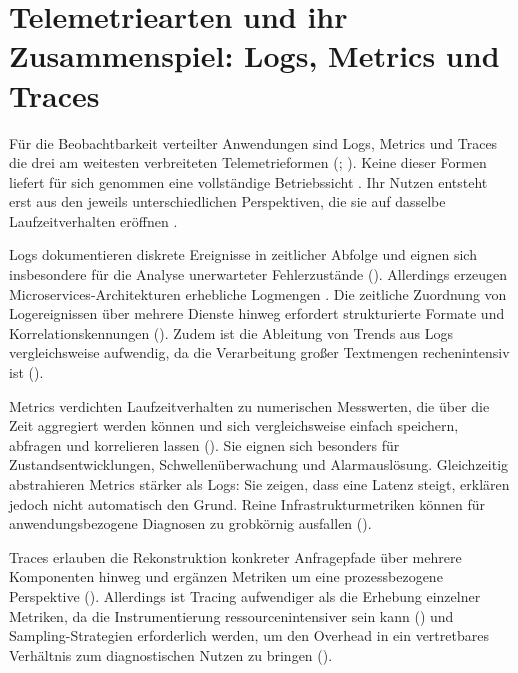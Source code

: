 
\section{Telemetriearten und ihr Zusammenspiel: Logs, Metrics und Traces}
 
Für die Beobachtbarkeit verteilter Anwendungen sind Logs, Metrics und Traces die drei am weitesten verbreiteten Telemetrieformen (\cite[S.~6]{li2022enjoy}; \cite[S.~86912--86913]{usman2022survey}). Keine dieser Formen liefert für sich genommen eine vollständige Betriebssicht \parencite[S.~48]{pappula2021building}. Ihr Nutzen entsteht erst aus den jeweils unterschiedlichen Perspektiven, die sie auf dasselbe Laufzeitverhalten eröffnen \parencite[S.~157]{garimilla2024designing}.
 
Logs dokumentieren diskrete Ereignisse in zeitlicher Abfolge und eignen sich insbesondere für die Analyse unerwarteter Fehlerzustände (\cite[S.~2]{albuquerque2025tracing}). Allerdings erzeugen Microservices-Architekturen erhebliche Logmengen \parencite[S.~25]{madupati2023observability}. Die zeitliche Zuordnung von Logereignissen über mehrere Dienste hinweg erfordert strukturierte Formate und Korrelationskennungen (\cite[S.~102]{sakinala2025observability}). Zudem ist die Ableitung von Trends aus Logs vergleichsweise aufwendig, da die Verarbeitung großer Textmengen rechenintensiv ist (\cite[S.~11]{albuquerque2025tracing}).
 
Metrics verdichten Laufzeitverhalten zu numerischen Messwerten, die über die Zeit aggregiert werden können und sich vergleichsweise einfach speichern, abfragen und korrelieren lassen (\cite[S.~86913]{usman2022survey}). Sie eignen sich besonders für Zustandsentwicklungen, Schwellenüberwachung und Alarmauslösung. Gleichzeitig abstrahieren Metrics stärker als Logs: Sie zeigen, dass eine Latenz steigt, erklären jedoch nicht automatisch den Grund. Reine Infrastrukturmetriken können für anwendungsbezogene Diagnosen zu grobkörnig ausfallen (\cite[S.~11]{albuquerque2025tracing}).
 
Traces erlauben die Rekonstruktion konkreter Anfragepfade über mehrere Komponenten hinweg und ergänzen Metriken um eine prozessbezogene Perspektive (\cite[S.~2]{albuquerque2025tracing}). Allerdings ist Tracing aufwendiger als die Erhebung einzelner Metriken, da die Instrumentierung ressourcenintensiver sein kann (\cite[S.~15]{giamattei2024monitoring}) und Sampling-Strategien erforderlich werden, um den Overhead in ein vertretbares Verhältnis zum diagnostischen Nutzen zu bringen (\cite[S.~10]{albuquerque2025tracing}).
 

